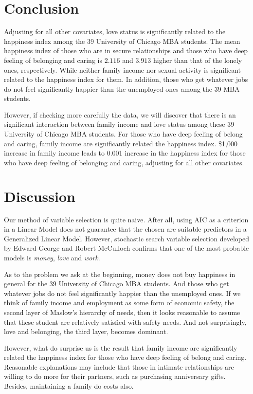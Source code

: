 \documentclass[11pt,letterpaper]{article}
\begin{document}
\section{Conclusion}
Adjusting for all other covariates, love status is significantly related to the happiness index among the 39 University of Chicago MBA students. The mean happiness index of those who are in secure relationships and those who have deep feeling of belonging and caring is $2.116$ and $3.913$ higher than that of the lonely ones, respectively. While neither family income nor sexual activity is significant related to the happiness index for them. In addition, those who get whatever jobs do not feel significantly happier than the unemployed ones among the 39 MBA students. \par
However, if checking more carefully the data, we will discover that there is an significant interaction between family income and love status among these 39 University of Chicago MBA students. For those who have deep feeling of belong and caring, family income are significantly related the happiness index. \$1,000 increase in family income leads to 0.001 increase in the happiness index for those who have deep feeling of belonging and caring, adjusting for all other covariates.

\section{Discussion}
Our method of variable selection is quite naive. After all, using AIC as a criterion in a Linear Model does not guarantee that the chosen are suitable predictors in a Generalized Linear Model. However, stochastic search variable selection developed by Edward George and Robert McCulloch confirms that one of the most probable models is \emph{money}, \emph{love} and \emph{work}\cite{a}. \par
As to the problem we ask at the beginning, money does not buy happiness in general for the 39 University of Chicago MBA students. And those who get whatever jobs do not feel significantly happier than the unemployed ones. If we think of family income and employment as some form of economic safety, the second layer of Maslow's hierarchy of needs\cite{b}, then it looks reasonable to assume that these student are relatively satisfied with safety needs. And not surprisingly, love and belonging, the third layer, becomes dominant. \par
However, what do surprise us is the result that family income are significantly related the happiness index for those who have deep feeling of belong and caring. Reasonable explanations may include that those in intimate relationships are willing to do more for their partners, such as purchasing anniversary gifts. Besides, maintaining a family do costs also.
\end{document}

